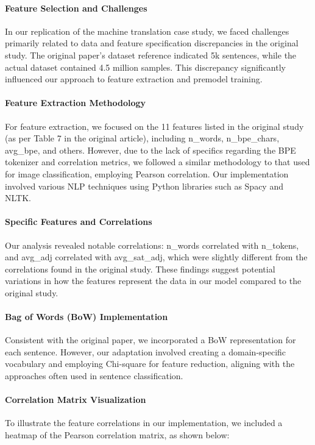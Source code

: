 \paragraph{Feature Selection and Challenges}
In our replication of the machine translation case study, we faced challenges primarily related to data and feature specification discrepancies in the original study. The original paper's dataset reference indicated 5k sentences, while the actual dataset contained 4.5 million samples. This discrepancy significantly influenced our approach to feature extraction and premodel training.

\paragraph{Feature Extraction Methodology}
For feature extraction, we focused on the 11 features listed in the original study (as per Table 7 in the original article), including n\_words, n\_bpe\_chars, avg\_bpe, and others. However, due to the lack of specifics regarding the BPE tokenizer and correlation metrics, we followed a similar methodology to that used for image classification, employing Pearson correlation. Our implementation involved various NLP techniques using Python libraries such as Spacy and NLTK.

\paragraph{Specific Features and Correlations}
Our analysis revealed notable correlations: n\_words correlated with n\_tokens, and avg\_adj correlated with avg\_sat\_adj, which were slightly different from the correlations found in the original study. These findings suggest potential variations in how the features represent the data in our model compared to the original study.

\paragraph{Bag of Words (BoW) Implementation}
Consistent with the original paper, we incorporated a BoW representation for each sentence. However, our adaptation involved creating a domain-specific vocabulary and employing Chi-square for feature reduction, aligning with the approaches often used in sentence classification.

\paragraph{Correlation Matrix Visualization}
To illustrate the feature correlations in our implementation, we included a heatmap of the Pearson correlation matrix, as shown below:

